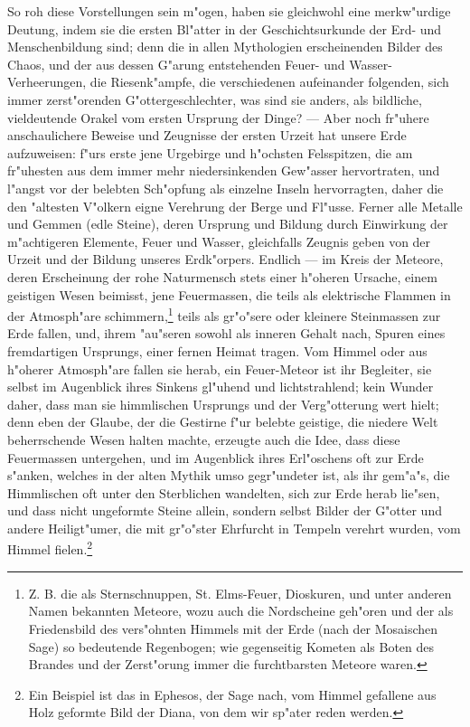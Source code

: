 \documentclass[a4paper, 11pt, oneside, polutonikogreek, german]{article}
\begin{document}
So roh diese Vorstellungen sein m"ogen, haben sie gleichwohl eine merkw"urdige Deutung, indem sie die ersten Bl"atter in der Geschichtsurkunde der Erd- und Menschenbildung sind; denn die in allen Mythologien erscheinenden Bilder des Chaos, und der aus dessen G"arung entstehenden Feuer- und Wasser-Verheerungen, die Riesenk"ampfe, die verschiedenen aufeinander folgenden, sich immer zerst"orenden G"ottergeschlechter, was sind sie anders, als bildliche, vieldeutende Orakel vom ersten Ursprung der Dinge? --- Aber noch fr"uhere anschaulichere Beweise und Zeugnisse der ersten Urzeit hat unsere Erde aufzuweisen: f"urs erste jene Urgebirge und h"ochsten Felsspitzen, die am fr"uhesten aus dem immer mehr niedersinkenden Gew"asser hervortraten, und l"angst vor der belebten Sch"opfung als einzelne Inseln hervorragten, daher die den "altesten V"olkern eigne Verehrung der Berge und Fl"usse. Ferner alle Metalle und Gemmen (edle Steine), deren Ursprung und Bildung durch Einwirkung der m"achtigeren Elemente, Feuer und Wasser, gleichfalls Zeugnis geben von der Urzeit und der Bildung unseres Erdk"orpers. Endlich --- im Kreis der Meteore, deren Erscheinung der rohe Naturmensch stets einer h"oheren Ursache, einem geistigen Wesen beimisst, jene Feuermassen, die teils als elektrische Flammen in der Atmosph"are schimmern,\footnote{Z. B. die als Sternschnuppen, St. Elms-Feuer, Dioskuren, und unter anderen Namen bekannten Meteore, wozu auch die Nordscheine geh"oren und der als Friedensbild des vers"ohnten Himmels mit der Erde (nach der Mosaischen Sage) so bedeutende Regenbogen; wie gegenseitig Kometen als Boten des Brandes und der Zerst"orung immer die furchtbarsten Meteore waren.} teils als gr"o"sere oder kleinere Steinmassen zur Erde fallen, und, ihrem "au"seren sowohl als inneren Gehalt nach, Spuren eines fremdartigen Ursprungs, einer fernen Heimat tragen. Vom Himmel oder aus h"oherer Atmosph"are fallen sie herab, ein Feuer-Meteor ist ihr Begleiter, sie selbst im Augenblick ihres Sinkens gl"uhend und lichtstrahlend; kein Wunder daher, dass man sie himmlischen Ursprungs und der Verg"otterung wert hielt; denn eben der Glaube, der die Gestirne f"ur belebte geistige, die niedere Welt beherrschende Wesen halten machte, erzeugte auch die Idee, dass diese Feuermassen untergehen, und im Augenblick ihres Erl"oschens oft zur Erde s"anken, welches in der alten Mythik umso gegr"undeter ist, als ihr gem"a"s, die Himmlischen oft unter den Sterblichen wandelten, sich zur Erde herab lie"sen, und dass nicht ungeformte Steine allein, sondern selbst Bilder der G"otter und andere Heiligt"umer, die mit gr"o"ster Ehrfurcht in Tempeln verehrt wurden, vom Himmel fielen.\footnote{Ein Beispiel ist das in Ephesos, der Sage nach, vom Himmel gefallene aus Holz geformte Bild der Diana, von dem wir sp"ater reden werden.}
\end{document}
